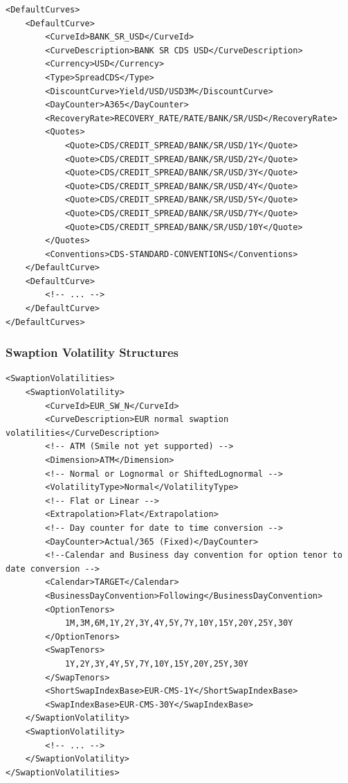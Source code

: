 \documentclass[12pt, a4paper]{article}
\begin{document}
\begin{lstlisting}[caption={Default curve configuration}, 	label=lst:defaultcurve_configuration]
<DefaultCurves>
	<DefaultCurve>
		<CurveId>BANK_SR_USD</CurveId>
		<CurveDescription>BANK SR CDS USD</CurveDescription>
		<Currency>USD</Currency>
		<Type>SpreadCDS</Type>
		<DiscountCurve>Yield/USD/USD3M</DiscountCurve>
		<DayCounter>A365</DayCounter>
		<RecoveryRate>RECOVERY_RATE/RATE/BANK/SR/USD</RecoveryRate>
		<Quotes>
			<Quote>CDS/CREDIT_SPREAD/BANK/SR/USD/1Y</Quote>
			<Quote>CDS/CREDIT_SPREAD/BANK/SR/USD/2Y</Quote>
			<Quote>CDS/CREDIT_SPREAD/BANK/SR/USD/3Y</Quote>
			<Quote>CDS/CREDIT_SPREAD/BANK/SR/USD/4Y</Quote>
			<Quote>CDS/CREDIT_SPREAD/BANK/SR/USD/5Y</Quote>
			<Quote>CDS/CREDIT_SPREAD/BANK/SR/USD/7Y</Quote>
			<Quote>CDS/CREDIT_SPREAD/BANK/SR/USD/10Y</Quote>
		</Quotes>
		<Conventions>CDS-STANDARD-CONVENTIONS</Conventions>
	</DefaultCurve>
	<DefaultCurve>
		<!-- ... -->
	</DefaultCurve>
</DefaultCurves>

\end{lstlisting}

\subsubsection{Swaption Volatility Structures}

\begin{lstlisting}[caption={Swaption volatility configuration}, 	label=lst:swaptionvol_configuration]
<SwaptionVolatilities>    
	<SwaptionVolatility>
		<CurveId>EUR_SW_N</CurveId>
		<CurveDescription>EUR normal swaption volatilities</CurveDescription>
		<!-- ATM (Smile not yet supported) -->
		<Dimension>ATM</Dimension>
		<!-- Normal or Lognormal or ShiftedLognormal -->
		<VolatilityType>Normal</VolatilityType>
		<!-- Flat or Linear -->
		<Extrapolation>Flat</Extrapolation>
		<!-- Day counter for date to time conversion -->
		<DayCounter>Actual/365 (Fixed)</DayCounter>
		<!--Calendar and Business day convention for option tenor to date conversion -->
		<Calendar>TARGET</Calendar>
		<BusinessDayConvention>Following</BusinessDayConvention>
		<OptionTenors>
			1M,3M,6M,1Y,2Y,3Y,4Y,5Y,7Y,10Y,15Y,20Y,25Y,30Y
		</OptionTenors>
		<SwapTenors>
			1Y,2Y,3Y,4Y,5Y,7Y,10Y,15Y,20Y,25Y,30Y
		</SwapTenors>
		<ShortSwapIndexBase>EUR-CMS-1Y</ShortSwapIndexBase>
		<SwapIndexBase>EUR-CMS-30Y</SwapIndexBase>
	</SwaptionVolatility>
    <SwaptionVolatility>
    	<!-- ... -->
    </SwaptionVolatility>
</SwaptionVolatilities>
\end{lstlisting}
\end{document}
